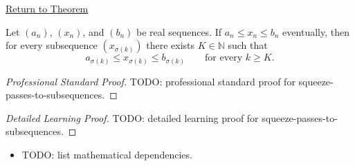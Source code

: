 \newpage
{}
\label{prf:squeeze-passes-to-subsequences}

\begin{remark*}[Return]
\hyperref[thm:squeeze-passes-to-subsequences]{Return to Theorem}
\end{remark*}

\begin{theorem*}
Let $(a_n)$, $(x_n)$, and $(b_n)$ be real sequences. If
$a_n\le x_n\le b_n$ eventually, then for every subsequence
$(x_{\sigma(k)})$ there exists $K\in\mathbb{N}$ such that
\[
  a_{\sigma(k)}\le x_{\sigma(k)}\le b_{\sigma(k)}
  \qquad
  \text{for every } k\ge K.
\]

\smallskip
\noindent
\end{theorem*}

\begin{proof}[Professional Standard Proof]
\LRAProofBodyStart
TODO: professional standard proof for squeeze-passes-to-subsequences.
\end{proof}

\begin{proof}[Detailed Learning Proof]
\LRAProofBodyStart
TODO: detailed learning proof for squeeze-passes-to-subsequences.
\end{proof}

\begin{remark*}
\end{remark*}

\begin{dependencies}
\begin{itemize}
  \item TODO: list mathematical dependencies.
\end{itemize}
\end{dependencies}

\clearpage
